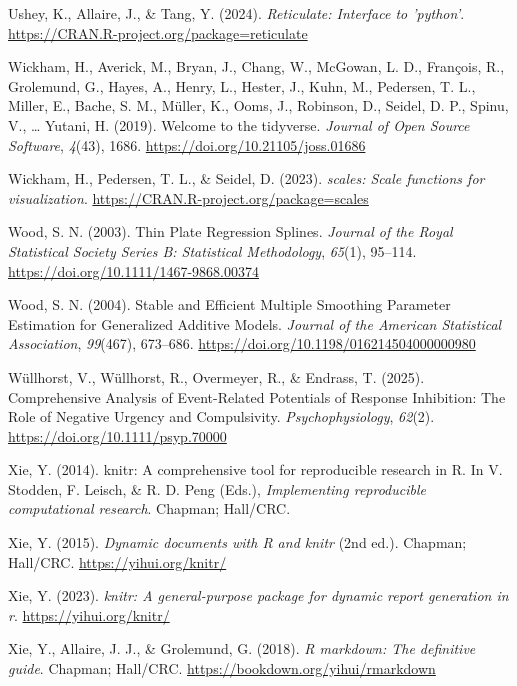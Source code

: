 \documentclass[
  doc,
  floatsintext,
  longtable,
  a4paper,
  nolmodern,
  notxfonts,
  notimes,
  colorlinks=true,linkcolor=blue,citecolor=blue,urlcolor=blue]{apa7}
\newlength{\cslhangindent}
\newenvironment{CSLReferences}[2] %
 {\begin{list}{}{%
  \setlength{\itemindent}{0pt}
  \setlength{\leftmargin}{0pt}
  \setlength{\parsep}{0pt}
  \ifodd #1
   \setlength{\leftmargin}{\cslhangindent}
   \setlength{\itemindent}{-1\cslhangindent}
  \fi
  \setlength{\itemsep}{#2\baselineskip}}}
 {\end{list}}
\begin{document}
\begin{CSLReferences}{1}{0}
Ushey, K., Allaire, J., \& Tang, Y. (2024). \emph{Reticulate: Interface
to 'python'}. \url{https://CRAN.R-project.org/package=reticulate}

Wickham, H., Averick, M., Bryan, J., Chang, W., McGowan, L. D.,
François, R., Grolemund, G., Hayes, A., Henry, L., Hester, J., Kuhn, M.,
Pedersen, T. L., Miller, E., Bache, S. M., Müller, K., Ooms, J.,
Robinson, D., Seidel, D. P., Spinu, V., \ldots{} Yutani, H. (2019).
Welcome to the {tidyverse}. \emph{Journal of Open Source Software},
\emph{4}(43), 1686. \url{https://doi.org/10.21105/joss.01686}

Wickham, H., Pedersen, T. L., \& Seidel, D. (2023). \emph{{scales}:
Scale functions for visualization}.
\url{https://CRAN.R-project.org/package=scales}

Wood, S. N. (2003). Thin Plate Regression Splines. \emph{Journal of the
Royal Statistical Society Series B: Statistical Methodology},
\emph{65}(1), 95--114. \url{https://doi.org/10.1111/1467-9868.00374}

Wood, S. N. (2004). Stable and Efficient Multiple Smoothing Parameter
Estimation for Generalized Additive Models. \emph{Journal of the
American Statistical Association}, \emph{99}(467), 673--686.
\url{https://doi.org/10.1198/016214504000000980}

Wüllhorst, V., Wüllhorst, R., Overmeyer, R., \& Endrass, T. (2025).
Comprehensive Analysis of Event{-}Related Potentials of Response
Inhibition: The Role of Negative Urgency and Compulsivity.
\emph{Psychophysiology}, \emph{62}(2).
\url{https://doi.org/10.1111/psyp.70000}

Xie, Y. (2014). {knitr}: A comprehensive tool for reproducible research
in {R}. In V. Stodden, F. Leisch, \& R. D. Peng (Eds.),
\emph{Implementing reproducible computational research}. Chapman;
Hall/CRC.

Xie, Y. (2015). \emph{Dynamic documents with {R} and knitr} (2nd ed.).
Chapman; Hall/CRC. \url{https://yihui.org/knitr/}

Xie, Y. (2023). \emph{{knitr}: A general-purpose package for dynamic
report generation in r}. \url{https://yihui.org/knitr/}

Xie, Y., Allaire, J. J., \& Grolemund, G. (2018). \emph{R markdown: The
definitive guide}. Chapman; Hall/CRC.
\url{https://bookdown.org/yihui/rmarkdown}


\end{CSLReferences}
\end{document}
